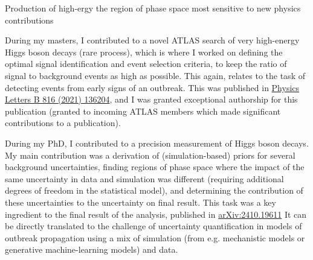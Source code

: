 \documentclass[11pt, a4paper]{awesome-cv}
\begin{document}
\begin{cvletter}


Production of high-ergy the region of phase space most sensitive to new physics contributions

During my masters, I contributed to a novel ATLAS search of very high-energy Higgs boson decays (rare process), which is  where I worked on defining the optimal signal identification and event selection criteria, to keep the ratio of signal to background events as high as possible. This again, relates to the task of detecting events from early signs of an outbreak. This was published in \href{https://doi.org/10.1016/j.physletb.2021.136204}{Physics Letters B 816 (2021) 136204}, and I was granted exceptional authorship for this publication (granted to incoming ATLAS members which made significant contributions to a publication).

During my PhD, I contributed to a precision measurement of Higgs boson decays. My main contribution was a derivation of (simulation-based) priors for several background uncertainties, finding regions of phase space where the impact of the same uncertainty in data and simulation was different (requiring additional degrees of freedom in the statistical model), and determining the contribution of these uncertainties to the uncertainty on final result. This task was a key ingredient to the final result of the analysis, published in \href{https://arxiv.org/abs/2410.19611}{arXiv:2410.19611} It can be directly translated to the challenge of uncertainty quantification in models of outbreak propagation using a mix of simulation (from e.g. mechanistic models or generative machine-learning models) and data.


\end{cvletter}
\end{document}
